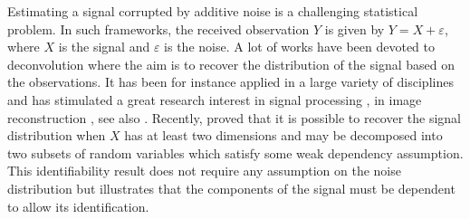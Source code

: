 \documentclass{article}
\begin{document}
Estimating a signal corrupted by additive noise  is a challenging statistical problem. In such frameworks, the received observation $Y$ is given by $Y = X + \varepsilon$,  where $X$ is the signal and $\varepsilon$ is the noise. A lot of works have been devoted to deconvolution where the aim is to recover the distribution of the signal based on the observations. It has been for instance applied in a large variety of disciplines and has stimulated a great research interest in signal processing \cite{moulines1997maximum,attias1998blind}, in image reconstruction \cite{kundur1996blind,campisi2017blind}, see also  \cite{meister:2009}. Recently, \cite{gassiat:lecorff:lehericy:2021} proved that it is possible to recover the signal distribution when $X$ has at least two dimensions and may be decomposed into two subsets of random variables which satisfy some weak dependency assumption. This identifiability result does not require any assumption on the noise distribution but illustrates that the components of the signal must be dependent to allow its identification. %
\end{document}
